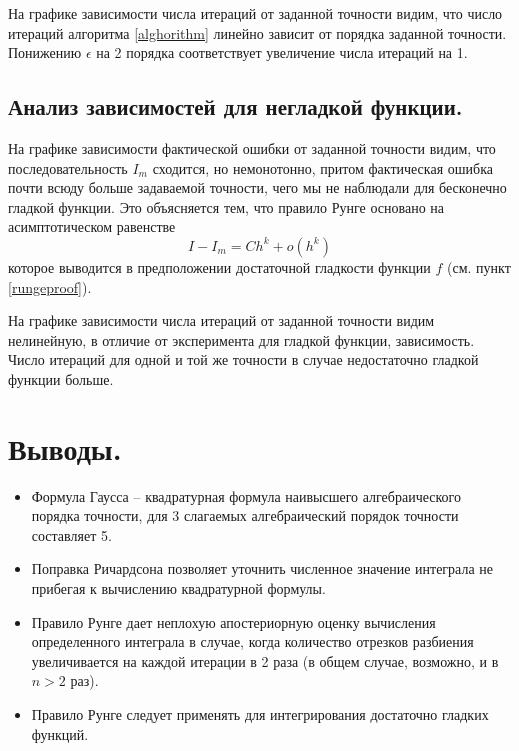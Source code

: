 \documentclass[a4paper, 12pt]{article}
\begin{document}
	На графике зависимости числа итераций от заданной точности видим, что число итераций алгоритма \ref{alghorithm} линейно зависит от порядка заданной точности. Понижению $\epsilon$ на 2 порядка соответствует увеличение числа итераций на 1.
	
	\subsection{Анализ зависимостей для негладкой функции.}
	
	На графике зависимости фактической ошибки от заданной точности видим, что последовательность $I_m$ сходится, но немонотонно, притом фактическая ошибка почти всюду больше задаваемой точности, чего мы не наблюдали для бесконечно гладкой функции. Это объясняется тем, что правило Рунге основано на асимптотическом равенстве
	\begin{equation}
		I-I_m=Ch^k+o(h^k)
	\end{equation}
	которое выводится в предположении достаточной гладкости функции $f$ (см. пункт \ref{rungeproof}).
	
	На графике зависимости числа итераций от заданной точности видим нелинейную, в отличие от эксперимента для гладкой функции, зависимость. Число итераций для одной и той же точности в случае недостаточно гладкой функции больше.
	
	\section{Выводы.}
	
	\begin{itemize}
		\item Формула Гаусса -- квадратурная формула наивысшего алгебраического порядка точности, для 3 слагаемых алгебраический порядок точности составляет 5.
		\item Поправка Ричардсона позволяет уточнить численное значение интеграла не прибегая к вычислению квадратурной формулы.
		\item Правило Рунге дает неплохую апостериорную оценку вычисления определенного интеграла в случае, когда количество отрезков разбиения увеличивается на каждой итерации в 2 раза (в общем случае, возможно, и в $n>2$ раз).
		\item Правило Рунге следует применять для интегрирования достаточно гладких функций.
	\end{itemize}
	
\end{document}
